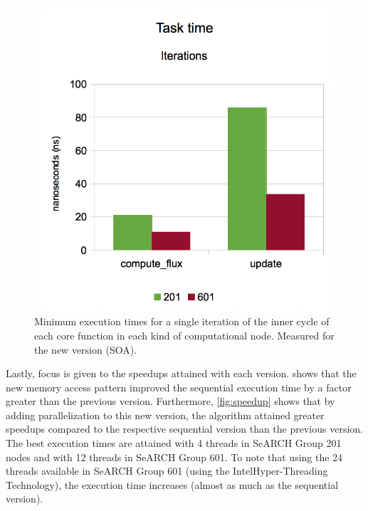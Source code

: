 \documentclass[abstract=on,9pt,twocolumn]{scrartcl}
\begin{document}
\begin{figure}[!p]
	\begin{center}
		\includegraphics[width=\columnwidth]{images/report.april/tasktimeSOA.png}
	\end{center}
	\caption{Minimum execution times for a single iteration of the inner cycle of each core function in each kind of computational node. Measured for the new version (SOA).}
	\label{fig:tasktimeSOA}
\end{figure}

Lastly, focus is given to the speedups attained with each version.  shows that the new memory access pattern improved the sequential execution time by a factor greater than the previous version. Furthermore, \cref{fig:speedup} shows that by adding parallelization to this new version, the algorithm attained greater speedups compared to the respective sequential version than the previous version. The best execution times are attained with 4 threads in SeARCH Group 201 nodes and with 12 threads in SeARCH Group 601. To note that using the 24 threads available in SeARCH Group 601 (using the Intel\textregistered Hyper-Threading Technology), the execution time increases (almost as much as the sequential version).
\end{document}

